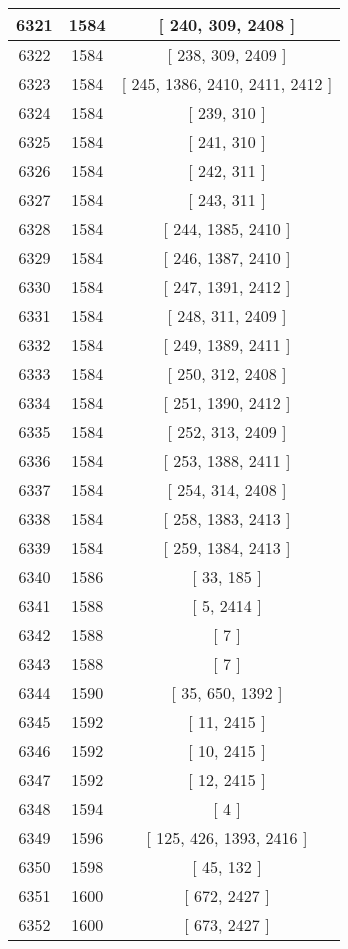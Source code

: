 \begin{center}
\begin{longtable}[H]{|| c c c ||}
\hline
6321 & 1584 & [ 240, 309, 2408 ] \\ 
\hline
6322 & 1584 & [ 238, 309, 2409 ] \\ 
\hline
6323 & 1584 & [ 245, 1386, 2410, 2411, 2412 ] \\ 
\hline
6324 & 1584 & [ 239, 310 ] \\ 
\hline
6325 & 1584 & [ 241, 310 ] \\ 
\hline
6326 & 1584 & [ 242, 311 ] \\ 
\hline
6327 & 1584 & [ 243, 311 ] \\ 
\hline
6328 & 1584 & [ 244, 1385, 2410 ] \\ 
\hline
6329 & 1584 & [ 246, 1387, 2410 ] \\ 
\hline
6330 & 1584 & [ 247, 1391, 2412 ] \\ 
\hline
6331 & 1584 & [ 248, 311, 2409 ] \\ 
\hline
6332 & 1584 & [ 249, 1389, 2411 ] \\ 
\hline
6333 & 1584 & [ 250, 312, 2408 ] \\ 
\hline
6334 & 1584 & [ 251, 1390, 2412 ] \\ 
\hline
6335 & 1584 & [ 252, 313, 2409 ] \\ 
\hline
6336 & 1584 & [ 253, 1388, 2411 ] \\ 
\hline
6337 & 1584 & [ 254, 314, 2408 ] \\ 
\hline
6338 & 1584 & [ 258, 1383, 2413 ] \\ 
\hline
6339 & 1584 & [ 259, 1384, 2413 ] \\ 
\hline
6340 & 1586 & [ 33, 185 ] \\ 
\hline
6341 & 1588 & [ 5, 2414 ] \\ 
\hline
6342 & 1588 & [ 7 ] \\ 
\hline
6343 & 1588 & [ 7 ] \\ 
\hline
6344 & 1590 & [ 35, 650, 1392 ] \\ 
\hline
6345 & 1592 & [ 11, 2415 ] \\ 
\hline
6346 & 1592 & [ 10, 2415 ] \\ 
\hline
6347 & 1592 & [ 12, 2415 ] \\ 
\hline
6348 & 1594 & [ 4 ] \\ 
\hline
6349 & 1596 & [ 125, 426, 1393, 2416 ] \\ 
\hline
6350 & 1598 & [ 45, 132 ] \\ 
\hline
6351 & 1600 & [ 672, 2427 ] \\ 
\hline
6352 & 1600 & [ 673, 2427 ] \\ 

\end{longtable}
\end{center}
